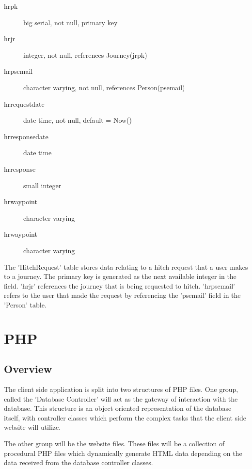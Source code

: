 \documentclass[11pt]{article}
\begin{document}
\begin{description}
	\begin{description}
	\item[hr\textunderscore pk] big serial, not null, primary key
	\item[hr\textunderscore jr] integer, not null, references Journey(jr\textunderscore pk)
	\item[hr\textunderscore ps\textunderscore email] character varying, not null, references Person(ps\textunderscore email)
	\item[hr\textunderscore request\textunderscore date] date time, not null, default = Now()
	\item[hr\textunderscore response\textunderscore date] date time
	\item[hr\textunderscore response] small integer
	\item[hr\textunderscore waypoint] character varying
	\item[hr\textunderscore waypoint] character varying
	\end{description}
	
The 'Hitch\textunderscore Request' table stores data relating to a hitch request that a user makes to a journey. The primary key is generated as the next available integer in the field. 'hr\textunderscore jr' references the journey that is being requested to hitch. 'hr\textunderscore ps\textunderscore email' refers to the user that made the request by referencing the 'ps\textunderscore email' field in the 'Person' table.
	
\end{description}


\section{PHP}
\subsection{Overview}
The client side application is split into two structures of PHP files. One group, called the 'Database Controller' will act as the gateway of interaction with the database. This structure is an object oriented representation of the database itself, with controller classes which perform the complex tasks that the client side website will utilize.

The other group will be the website files. These files will be a collection of procedural PHP files which dynamically generate HTML data depending on the data received from the database controller classes.
\end{document}
